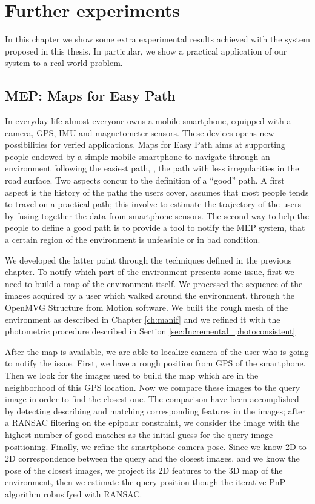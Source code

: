 \chapter{Further experiments}
\label{ch:further}
In this chapter we show some extra experimental results achieved with the system proposed in this thesis.
In particular, we show a practical application of our system to a real-world problem. 
\section{MEP: Maps for Easy Path}
In everyday life almost everyone owns a mobile smartphone, equipped with a camera, GPS, IMU and magnetometer sensors. 
These devices opens new possibilities for veried applications.
Maps for Easy Path aims at supporting people endowed by a simple mobile smartphone to navigate through an environment following the easiest path, \ie, the path with less irregularities in the road surface. 
Two aspects concur to the definition of a ``good'' path.
A first aspect is the history of the paths the users cover, assumes that most people tends to travel on a practical path; this involve to estimate the trajectory of the users by fusing together the data from smartphone sensors. 
The second way to help the people to define a good path is to provide a tool to notify the MEP system, that a certain  region of the environment is unfeasible or in bad condition.

We developed the latter point through the techniques defined in the previous chapter.
To notify which part of the environment presents some issue, first we need to build a map of the environment itself. 
We processed the sequence of the images acquired by a user which walked around the environment, through the OpenMVG Structure from Motion software. 
We built the rough mesh of the environment as described in Chapter \ref{ch:manif} and we refined it with the photometric procedure described in Section \ref{sec:Incremental_photoconsistent}

After the map is available, we are able to localize  camera  of the user who is going to notify the issue.
First, we have a rough position from GPS of the smartphone. 
Then we look for the images used to build the map which are in the neighborhood of this GPS location.
Now we compare these images to the query image in order to find the closest one. 
The comparison have been accomplished by detecting describing  and matching corresponding features in the images; after a RANSAC filtering on the epipolar constraint, we consider the image with the highest number of good matches as the initial guess for the query image positioning.
Finally, we refine the smartphone camera pose. 
Since we know 2D to 2D correspondence between the query and the closest images, and we know the pose of the closest images, we project its 2D features to the 3D map of the environment, then we estimate the query position though the iterative PnP algorithm \cite{hartley2003multiple} robusifyed with RANSAC.




